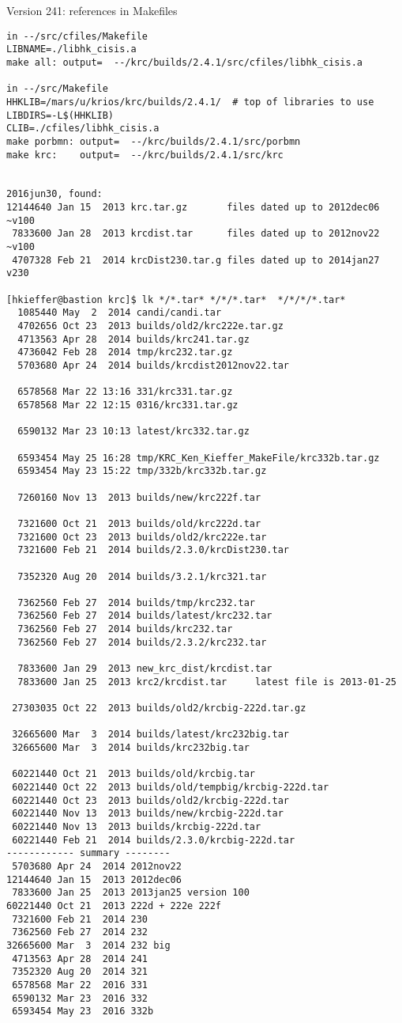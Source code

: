 \documentclass{article}
\begin{document}
Version 241: references in Makefiles
\vspace{-3.mm} 
\begin{verbatim}
in --/src/cfiles/Makefile 
LIBNAME=./libhk_cisis.a
make all: output=  --/krc/builds/2.4.1/src/cfiles/libhk_cisis.a 

in --/src/Makefile
HHKLIB=/mars/u/krios/krc/builds/2.4.1/  # top of libraries to use
LIBDIRS=-L$(HHKLIB)  
CLIB=./cfiles/libhk_cisis.a
make porbmn: output=  --/krc/builds/2.4.1/src/porbmn
make krc:    output=  --/krc/builds/2.4.1/src/krc


2016jun30, found:
12144640 Jan 15  2013 krc.tar.gz       files dated up to 2012dec06 ~v100
 7833600 Jan 28  2013 krcdist.tar      files dated up to 2012nov22 ~v100
 4707328 Feb 21  2014 krcDist230.tar.g files dated up to 2014jan27  v230

[hkieffer@bastion krc]$ lk */*.tar* */*/*.tar*  */*/*/*.tar*
  1085440 May  2  2014 candi/candi.tar
  4702656 Oct 23  2013 builds/old2/krc222e.tar.gz
  4713563 Apr 28  2014 builds/krc241.tar.gz
  4736042 Feb 28  2014 tmp/krc232.tar.gz
  5703680 Apr 24  2014 builds/krcdist2012nov22.tar

  6578568 Mar 22 13:16 331/krc331.tar.gz
  6578568 Mar 22 12:15 0316/krc331.tar.gz

  6590132 Mar 23 10:13 latest/krc332.tar.gz

  6593454 May 25 16:28 tmp/KRC_Ken_Kieffer_MakeFile/krc332b.tar.gz
  6593454 May 23 15:22 tmp/332b/krc332b.tar.gz

  7260160 Nov 13  2013 builds/new/krc222f.tar

  7321600 Oct 21  2013 builds/old/krc222d.tar
  7321600 Oct 23  2013 builds/old2/krc222e.tar
  7321600 Feb 21  2014 builds/2.3.0/krcDist230.tar

  7352320 Aug 20  2014 builds/3.2.1/krc321.tar

  7362560 Feb 27  2014 builds/tmp/krc232.tar
  7362560 Feb 27  2014 builds/latest/krc232.tar
  7362560 Feb 27  2014 builds/krc232.tar
  7362560 Feb 27  2014 builds/2.3.2/krc232.tar

  7833600 Jan 29  2013 new_krc_dist/krcdist.tar
  7833600 Jan 25  2013 krc2/krcdist.tar     latest file is 2013-01-25

 27303035 Oct 22  2013 builds/old2/krcbig-222d.tar.gz

 32665600 Mar  3  2014 builds/latest/krc232big.tar
 32665600 Mar  3  2014 builds/krc232big.tar

 60221440 Oct 21  2013 builds/old/krcbig.tar
 60221440 Oct 22  2013 builds/old/tempbig/krcbig-222d.tar
 60221440 Oct 23  2013 builds/old2/krcbig-222d.tar
 60221440 Nov 13  2013 builds/new/krcbig-222d.tar
 60221440 Nov 13  2013 builds/krcbig-222d.tar
 60221440 Feb 21  2014 builds/2.3.0/krcbig-222d.tar
------------ summary --------
 5703680 Apr 24  2014 2012nov22 
12144640 Jan 15  2013 2012dec06
 7833600 Jan 25  2013 2013jan25 version 100
60221440 Oct 21  2013 222d + 222e 222f
 7321600 Feb 21  2014 230
 7362560 Feb 27  2014 232
32665600 Mar  3  2014 232 big
 4713563 Apr 28  2014 241
 7352320 Aug 20  2014 321
 6578568 Mar 22  2016 331
 6590132 Mar 23  2016 332
 6593454 May 23  2016 332b


\end{verbatim}
\end{document}
